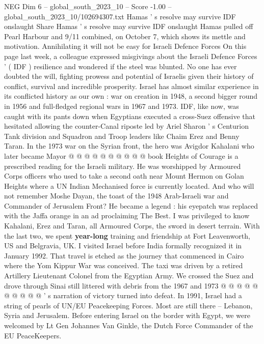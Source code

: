 \begin{textsample}{NEG Dim 6 – global\_south\_2023\_10 – Score -1.00 – global\_south\_2023\_10/102694307.txt}  \label{ex:f6_neg_151}
Hamas ' s resolve may survive IDF onslaught Share Hamas ' s resolve may survive IDF onslaught Hamas pulled off Pearl Harbour and 9/11 combined, on October 7, which shows its mettle and motivation.
Annihilating it will not be easy for Israeli Defence Forces On this page last week, a colleague expressed misgivings about the Israeli Defence Forces ' ( IDF ) resilience and wondered if the steel was blunted.
No one has ever doubted the will, fighting prowess and potential of Israelis given their history of conflict, survival and incredible prosperity.
Israel has almost similar experience in its conflicted history as our own : war on creation in 1948, a second bigger round in 1956 and full-fledged regional wars in 1967 and 1973.
IDF, like now, was caught with its pants down when Egyptians executed a cross-Suez offensive that hesitated allowing the counter-Canal riposte led by Ariel Sharon ' s Centurion Tank division and Squadron and Troop leaders like Chaim Erez and Benny Taran.
In the 1973 war on the Syrian front, the hero was Avigdor Kahalani who later became Mayor @ @ @ @ @ @ @ @ @ @ book Heights of Courage is a prescribed reading for the Israeli military.
He was worshipped by Armoured Corps officers who used to take a second oath near Mount Hermon on Golan Heights where a UN Indian Mechanised force is currently located.
And who will not remember Moshe Dayan, the toast of the 1948 Arab-Israeli war and Commander of Jerusalem Front?
He became a legend : his eyepatch was replaced with the Jaffa orange in an ad proclaiming The Best.
I was privileged to know Kahalani, Erez and Taran, all Armoured Corps, the sword in desert terrain.
With the last two, we spent \textbf{year-long} training and friendship at Fort Leavenworth, US and Belgravia, UK.
I visited Israel before India formally recognized it in January 1992.
That travel is etched as the journey that commenced in Cairo where the Yom Kippur War was conceived.
The taxi was driven by a retired Artillery Lieutenant Colonel from the Egyptian Army.
We crossed the Suez and drove through Sinai still littered with debris from the 1967 and 1973 @ @ @ @ @ @ @ @ @ @ ' s narration of victory turned into defeat.
In 1991, Israel had a string of pearls of UN/EU Peacekeeping Forces.
Most are still there -- Lebanon, Syria and Jerusalem.
Before entering Israel on the border with Egypt, we were welcomed by Lt Gen Johannes Van Ginkle, the Dutch Force Commander of the EU PeaceKeepers.

\end{textsample}
